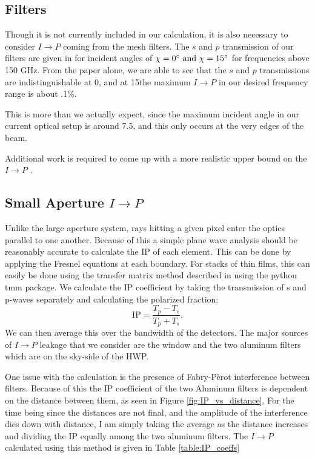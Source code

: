\documentclass{article}
\theoremstyle{remark}
\newcommand{\tab}{\hspace*{2em}}
\renewcommand{\t}[1]{\text{#1}}
\newcommand{\ip}{$I\rightarrow P$ }
\begin{document}
\subsection{Filters}
\tab Though it is not currently included in our calculation, it is also necessary to consider \ip coming from the mesh filters. 
The $s$ and $p$ transmission of our filters are given in \cite{pisano_polarisation_2006} for incident angles of 
$\chi = 0\degree \t{ and } \chi = 15\degree$ for frequencies above 150 GHz.
From the paper alone, we are able to see that the $s$ and $p$ transmissions are indistinguishable at 0\degree, 
and at 15\degree the maximum \ip in our desired frequency range is about .1\%.

\tab This is more than we actually expect, since the maximum incident angle in our current optical setup is 
around 7.5\degree, and this only occurs at the very edges of the beam.

Additional work is required to come up with a more realistic upper bound on the \ip.


\subsection{Small Aperture \ip}
Unlike the large aperture system, rays hitting a given pixel enter the optics parallel to one another. 
Because of this a simple plane wave analysis should be reasonably accurate to calculate the IP of each element. 
This can be done by applying the Fresnel equations at each boundary.
For stacks of thin films, this can easily be done using the transfer matrix method described in \cite{essinger-hileman_transfer_2013} using the python tmm package. 
We calculate the IP coefficient by taking the transmission of s and p-waves separately and calculating the polarized fraction:
\[\text{IP} = \frac{T_p - T_s}{T_p + T_s}.\]
We can then average this over the bandwidth of the detectors.
The major sources of \ip leakage that we consider are the window and the two aluminum filters which are on the sky-side of the HWP.

One issue with the calculation is the presence of Fabry-P\`{e}rot interference between filters.
Because of this the IP coefficient of the two Aluminum filters is dependent on the distance between them, as seen in Figure \ref{fig:IP_vs_distance}.
For the time being since the distances are not final, and the amplitude of the interference dies down with distance, I am simply taking the average as the distance increases and 
dividing the IP equally among the two aluminum filters. The \ip calculated using this method is given in Table \ref{table:IP_coeffs}
\end{document}
